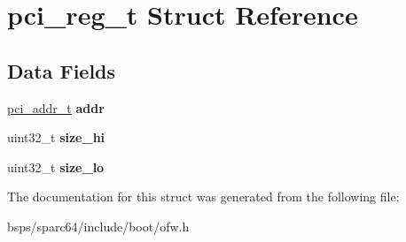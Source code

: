 \hypertarget{structpci__reg__t}{}\section{pci\+\_\+reg\+\_\+t Struct Reference}
\label{structpci__reg__t}
\subsection*{Data Fields}
\begin{DoxyCompactItemize}
\item 
\mbox{\label{structpci__reg__t_ac154d6a06d2074f4d75577756d87f8ff}} 
\mbox{\hyperlink{structpci__addr__t}{pci\+\_\+addr\+\_\+t}} {\bfseries addr}
\item 
\mbox{\label{structpci__reg__t_a39986bcfe93b8eaab262a81a267abd9a}} 
uint32\+\_\+t {\bfseries size\+\_\+hi}
\item 
\mbox{\label{structpci__reg__t_a80591fb820f9c4d969f85553e0745980}} 
uint32\+\_\+t {\bfseries size\+\_\+lo}
\end{DoxyCompactItemize}


The documentation for this struct was generated from the following file\+:\begin{DoxyCompactItemize}
\item 
bsps/sparc64/include/boot/ofw.\+h\end{DoxyCompactItemize}
